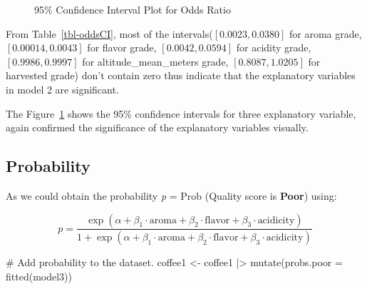 \documentclass[
  letterpaper,
  DIV=11,
  numbers=noendperiod]{scrartcl}
\newenvironment{Shaded}{\begin{snugshade}}{\end{snugshade}}
\newcommand{\AttributeTok}[1]{\textcolor[rgb]{0.40,0.45,0.13}{#1}}
\newcommand{\CommentTok}[1]{\textcolor[rgb]{0.37,0.37,0.37}{#1}}
\newcommand{\FunctionTok}[1]{\textcolor[rgb]{0.28,0.35,0.67}{#1}}
\newcommand{\NormalTok}[1]{\textcolor[rgb]{0.00,0.23,0.31}{#1}}
\newcommand{\OtherTok}[1]{\textcolor[rgb]{0.00,0.23,0.31}{#1}}
\newcommand{\SpecialCharTok}[1]{\textcolor[rgb]{0.37,0.37,0.37}{#1}}
\begin{document}
\begin{figure}[H]


\caption{\label{fig-CIplotodd}95\% Confidence Interval Plot for Odds
Ratio}

\end{figure}%

From Table~\ref{tbl-oddsCI}, most of the intervals(\([0.0023, 0.0380]\)
for aroma grade, \([0.00014,0.0043]\) for flavor grade,
\([0.0042, 0.0594]\) for acidity grade, \([0.9986, 0.9997]\) for
altitude\_mean\_meters grade, \([0.8087, 1.0205]\) for harvested grade)
don't contain zero thus indicate that the explanatory variables in model
2 are significant.

The Figure~\ref{fig-CIplotodd} shows the 95\% confidence intervals for
three explanatory variable, again confirmed the significance of the
explanatory variables visually.

\subsection{Probability}\label{probability}

As we could obtain the probability \emph{p} = Prob (Quality score is
\textbf{Poor}) using:

\[
p = \frac{\exp(\alpha + \beta_1 \cdot \textrm{aroma} +\beta_2 \cdot \textrm{flavor} + \beta_3 \cdot \textrm{acidicity})}{1 + \exp(\alpha + \beta_1 \cdot \textrm{aroma} +\beta_2 \cdot \textrm{flavor} + \beta_3 \cdot \textrm{acidicity})}
\]

\begin{Shaded}
\begin{Highlighting}[]
\CommentTok{\# Add probability to the dataset.}
\NormalTok{coffee1 }\OtherTok{\textless{}{-}}\NormalTok{ coffee1 }\SpecialCharTok{|\textgreater{}}
  \FunctionTok{mutate}\NormalTok{(}\AttributeTok{probs.poor =} \FunctionTok{fitted}\NormalTok{(model3))}
\end{Highlighting}
\end{Shaded}
\end{document}
